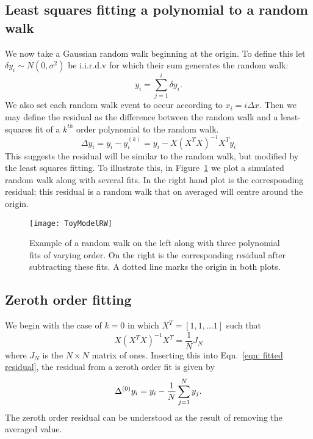 \subsection{Least squares fitting a polynomial to a random walk}
We now take a Gaussian random walk beginning at the origin. To define this let
$\delta y_{i} \sim N(0, \sigma^{2})$ be i.i.r.d.v for which their sum generates
the random walk:
\begin{equation}
y_{i} = \sum_{j=1}^{i}\delta y_{i}.
\label{eqn: ToyModel RW definition}
\end{equation}
We also set each random walk event to occur according to $x_{i} = i \Delta
x$. Then we may define the
residual as the difference between the random walk and a least-squares fit of a
$k^{th}$ order polynomial to the random walk.
\begin{equation}
\Delta y_{i} = y_{i} - y_{i}^{(k)} = y_{i} - X \left(X^{T}X\right)^{-1} X^{T} y_{i}
\label{eqn: fitted residual}
\end{equation}
This suggests the residual will be similar to the random walk, but modified by
the least squares fitting.  To illustrate this, in Figure~\ref{fig: ToyModelRW}
we plot a simulated random walk along with several fits. In the right hand plot
is the corresponding residual; this residual is a random walk that on averaged
will centre around the origin.
\begin{figure}[htb]
\centering
\texttt{[image: ToyModelRW]}
\caption{Example of a random walk on the left along with three polynomial fits
of varying order. On the right is the corresponding residual after subtracting
these fits. A dotted line marks the origin in both plots.}
\label{fig: ToyModelRW}
\end{figure}

\subsection{Zeroth order fitting}

We begin with the case of $k=0$ in which $X^{T} = [1, 1, \dots 1]$ such
that
\begin{equation}
X \left(X^{T}X\right)^{-1} X^{T} = \frac{1}{N} J_{N}
\end{equation}
where $J_{N}$ is the $N\times N$ matrix of ones.  Inserting this into
Eqn.~\eqref{eqn: fitted residual}, the residual from a zeroth order fit is given
by
\begin{equation}
\Delta^{(0)}  y_{i}= y_{i} - \frac{1}{N} \sum_{j=1}^{N}y_{j}.
\end{equation}
The zeroth order residual can be understood as the result of removing the
averaged value.

